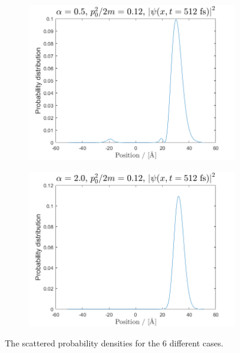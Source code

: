 \begin{figure}[H]
\begin{subfigure}[t]{0.47\textwidth}
	\includegraphics[width=\textwidth]{graphics/task3/a1e3.png}
	\caption{}
	\label{fig:3_e}
\end{subfigure}
\begin{subfigure}[t]{0.47\textwidth}
	\includegraphics[width=\textwidth]{graphics/task3/a2e3.png}
	\caption{}
	\label{fig:3_f}
\end{subfigure}

\caption{The scattered probability densities for the 6 different cases.}
\label{fig:3}
\end{figure}


